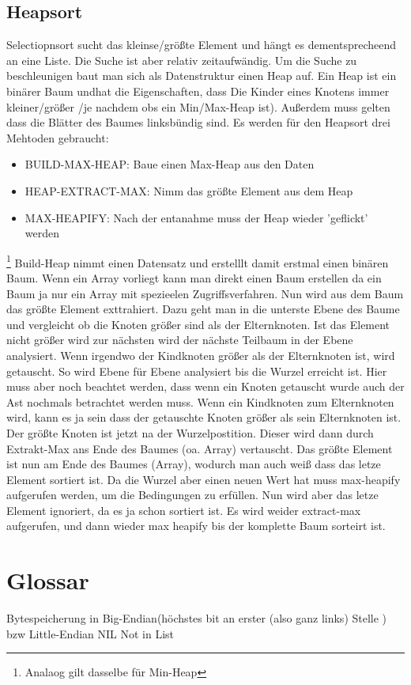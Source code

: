 \documentclass[a4paper]{scrartcl}
\begin{document}
        \subsection{Heapsort}
            Selectiopnsort sucht das kleinse/größte Element und hängt es dementsprecheend an eine Liste. Die Suche ist aber relativ zeitaufwändig. Um die 
            Suche zu beschleunigen baut man sich als Datenstruktur einen Heap auf. Ein Heap ist ein binärer Baum undhat die Eigenschaften, dass Die Kinder 
            eines Knotens immer kleiner/größer /je nachdem obs ein Min/Max-Heap ist). Außerdem muss gelten dass die Blätter des Baumes linksbündig sind.
            Es werden für den Heapsort drei Mehtoden gebraucht:
            \begin{itemize}
                \item BUILD-MAX-HEAP: Baue einen Max-Heap aus den Daten
                \item HEAP-EXTRACT-MAX: Nimm das größte Element aus dem Heap
                \item MAX-HEAPIFY: Nach der entanahme muss der Heap wieder 'geflickt' werden
            \end{itemize} \footnote{Analaog gilt dasselbe für Min-Heap}
            Build-Heap nimmt einen Datensatz und erstelllt damit erstmal einen binären Baum. Wenn ein Array vorliegt kann man direkt einen Baum erstellen
            da ein Baum ja nur ein Array mit spezieelen Zugriffsverfahren. Nun wird aus dem Baum das größte Element exttrahiert. Dazu geht man in die unterste Ebene
            des Baume und vergleicht ob die Knoten größer sind als der Elternknoten. Ist das Element nicht größer wird zur nächsten wird der nächste Teilbaum in der Ebene
            analysiert. Wenn irgendwo der Kindknoten größer als der Elternknoten ist, wird getauscht. So wird Ebene für Ebene analysiert bis die Wurzel erreicht ist. Hier muss
            aber noch beachtet werden, dass wenn ein Knoten getauscht wurde auch der Ast nochmals betrachtet werden muss. Wenn ein Kindknoten zum Elternknoten wird, kann
            es ja sein dass der getauschte Knoten größer als sein Elternknoten ist. Der größte Knoten ist jetzt na der Wurzelpostition. Dieser wird dann durch Extrakt-Max
            ans Ende des Baumes (oa. Array) vertauscht. Das größte Element ist nun am Ende des Baumes (Array), wodurch man auch weiß dass das letze Element sortiert ist.
            Da die Wurzel aber einen neuen Wert hat muss max-heapify aufgerufen werden, um die Bedingungen zu erfüllen. Nun wird aber das letze Element ignoriert, da es ja
            schon sortiert ist. Es wird weider extract-max aufgerufen, und dann wieder max heapify bis der komplette Baum sorteirt ist.  
    \section{Glossar}
        Bytespeicherung in Big-Endian(höchstes bit an erster (also  ganz links) Stelle ) bzw Little-Endian
        NIL Not in List
\end{document}
